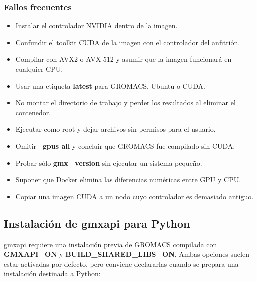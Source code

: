 \documentclass[
  spanish,
  11pt,
  a4paper]{article}
\newenvironment{Shaded}{\begin{snugshade}}{\end{snugshade}}
\newcommand{\AttributeTok}[1]{\textcolor[rgb]{0.13,0.29,0.53}{#1}}
\newcommand{\FunctionTok}[1]{\textcolor[rgb]{0.13,0.29,0.53}{\textbf{#1}}}
\newcommand{\NormalTok}[1]{#1}
\newcommand{\OperatorTok}[1]{\textcolor[rgb]{0.81,0.36,0.00}{\textbf{#1}}}
\newcommand{\StringTok}[1]{\textcolor[rgb]{0.31,0.60,0.02}{#1}}
\newcommand{\VariableTok}[1]{\textcolor[rgb]{0.00,0.00,0.00}{#1}}
\providecommand{\tightlist}{%
  \setlength{\itemsep}{0pt}\setlength{\parskip}{0pt}}
\begin{document}
\subsubsection{Fallos frecuentes}\label{fallos-frecuentes}

\begin{itemize}
\tightlist
\item
  Instalar el controlador NVIDIA dentro de la imagen.
\item
  Confundir el toolkit CUDA de la imagen con el controlador del
  anfitrión.
\item
  Compilar con AVX2 o AVX-512 y asumir que la imagen funcionará en
  cualquier CPU.
\item
  Usar una etiqueta \textbf{latest} para GROMACS, Ubuntu o CUDA.
\item
  No montar el directorio de trabajo y perder los resultados al eliminar
  el contenedor.
\item
  Ejecutar como root y dejar archivos sin permisos para el usuario.
\item
  Omitir \textbf{--gpus all} y concluir que GROMACS fue compilado sin
  CUDA.
\item
  Probar sólo \textbf{gmx --version} sin ejecutar un sistema pequeño.
\item
  Suponer que Docker elimina las diferencias numéricas entre GPU y CPU.
\item
  Copiar una imagen CUDA a un nodo cuyo controlador es demasiado
  antiguo.
\end{itemize}

\subsection{Instalación de gmxapi para
Python}\label{instalaciuxf3n-de-gmxapi-para-python}

gmxapi requiere una instalación previa de GROMACS compilada con
\textbf{GMXAPI=ON} y \textbf{BUILD\_SHARED\_LIBS=ON}. Ambas opciones
suelen estar activadas por defecto, pero conviene declararlas cuando se
prepara una instalación destinada a Python:

\begin{Shaded}
\end{Shaded}
\end{document}
